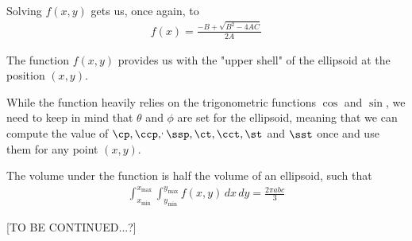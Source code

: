 Solving $f(x, y)$ gets us, once again, to 
\begin{align}
    \label{eq:ellipsoid_final-ellipsoid}
    f(x) = \frac{-B + \sqrt{B^2 - 4 A C}}{2 A}
\end{align}

The function $f(x, y)$ provides us with the "upper shell" of the ellipsoid at the position $(x, y)$.

While the function heavily relies on the trigonometric functions $\cos$ and $\sin$, we need to keep in mind that $\theta$ and $\phi$ are set for the ellipsoid, meaning that we can compute the value of $\cp, \ccp, \sp, \ssp, \ct, \cct, \st$ and $\sst$ once and use them for any point $(x, y)$.


The volume under the function is half the volume of an ellipsoid, such that 
\begin{align}
    \int_{x_{\text{min}}}^{x_{\text{max}}} \int_{y_{\text{min}}}^{y_{\text{max}}} f(x, y) \,dx \,dy = \frac{2 \pi a b c}{3}
\end{align}

[TO BE CONTINUED...?]

